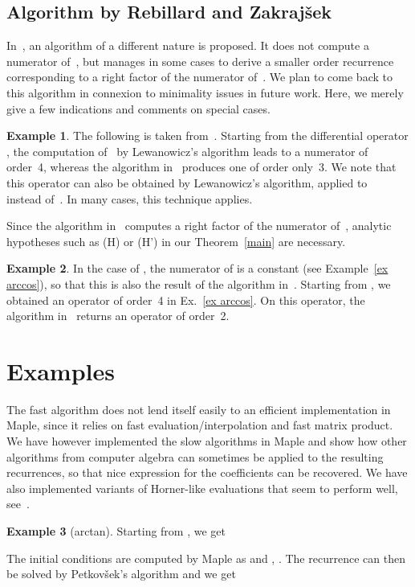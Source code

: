 \documentclass{amsart}
\theoremstyle{definition}
\newtheorem{example}{Example}
\begin{document}
\subsection{Algorithm by Rebillard and Zakraj\v{s}ek}\label{rebillard-zakrajsek}
In~\cite{RebillardZakrajsek2006}, an algorithm of a different nature is proposed. It does not compute a numerator of~, but manages in some cases to derive a smaller order recurrence corresponding to a right factor of the numerator of~. We plan to come back to this algorithm in connexion to minimality issues in future work. Here, we merely give a few indications and comments on special cases.
\begin{example} The following is taken from~\cite{RebillardZakrajsek2006}. Starting from the differential operator , the computation of~ by Lewanowicz's algorithm leads to a numerator of order~4, whereas the algorithm in~\cite{RebillardZakrajsek2006} produces one of order only~3. We note that this operator can also be obtained by Lewanowicz's algorithm, applied to~ instead of~. In many cases, this technique applies.
\end{example}
Since the algorithm in~\cite{RebillardZakrajsek2006} computes a right factor of the numerator of~, analytic hypotheses such as (H) or (H') in our Theorem~\ref{main} are necessary.
\begin{example} In the case of , the numerator of  is a constant (see Example~\ref{ex arccos}), so that this is also the result of the algorithm in~\cite{RebillardZakrajsek2006}. Starting from , we obtained an operator of order~4 in Ex.~\ref{ex arccos}. On this operator, the algorithm in~\cite{RebillardZakrajsek2006} returns an operator of order~2. 
\end{example}

\section{Examples}\label{sec:examples}
The fast algorithm does not lend itself easily to an efficient implementation in Maple, since it relies on fast evaluation/interpolation and fast matrix product. We have however implemented the slow algorithms in Maple and show how other algorithms from computer algebra can sometimes be applied to the resulting recurrences, so that nice expression for the coefficients can be recovered. We have also implemented variants of Horner-like evaluations that seem to perform well, see~\cite{Benoit2008}.


\begin{example}[arctan] Starting from , we get
	
The initial conditions are computed by Maple as  and , . The recurrence can then be solved by Petkov\v sek's algorithm and we get

\end{example}
\end{document}
